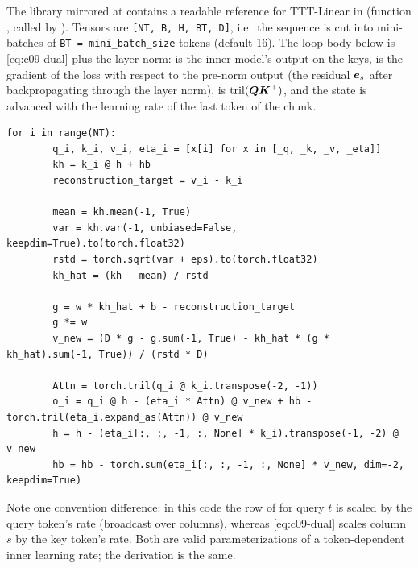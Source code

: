 \begin{implnote}[title={In the code: the dual form in \fla}]
The \fla{} library mirrored at  contains a readable
reference for TTT-Linear in  (function ,
called by ). Tensors are \texttt{[NT, B, H, BT, D]}, i.e.\ the
sequence is cut into  mini-batches of \texttt{BT = mini\_batch\_size} tokens (default
16). The loop body below is \eqref{eq:c09-dual} plus the layer norm:  is the inner
model's output on the keys,  is the gradient of the loss with respect to the
pre-norm output (the residual $\bm{e}_s$ after backpropagating through the layer norm),
 is $\operatorname{tril}(\bm{Q}\bm{K}^{\top})$, and the state  is advanced with the
learning rate of the last token of the chunk.
\end{implnote}

\begin{lstlisting}[caption={Excerpt from \texttt{repos/\allowbreak{}fla-org\_\_flash-linear-attention/\allowbreak{}fla/\allowbreak{}ops/\allowbreak{}ttt/\allowbreak{}naive.py}},label={lst:c09-fla-ttt}]
    for i in range(NT):
        q_i, k_i, v_i, eta_i = [x[i] for x in [_q, _k, _v, _eta]]
        kh = k_i @ h + hb
        reconstruction_target = v_i - k_i

        mean = kh.mean(-1, True)
        var = kh.var(-1, unbiased=False, keepdim=True).to(torch.float32)
        rstd = torch.sqrt(var + eps).to(torch.float32)
        kh_hat = (kh - mean) / rstd

        g = w * kh_hat + b - reconstruction_target
        g *= w
        v_new = (D * g - g.sum(-1, True) - kh_hat * (g * kh_hat).sum(-1, True)) / (rstd * D)

        Attn = torch.tril(q_i @ k_i.transpose(-2, -1))
        o_i = q_i @ h - (eta_i * Attn) @ v_new + hb - torch.tril(eta_i.expand_as(Attn)) @ v_new
        h = h - (eta_i[:, :, -1, :, None] * k_i).transpose(-1, -2) @ v_new
        hb = hb - torch.sum(eta_i[:, :, -1, :, None] * v_new, dim=-2, keepdim=True)
\end{lstlisting}

Note one convention difference: in this code the row of  for query $t$ is scaled
by the query token's rate  (broadcast over columns), whereas
\eqref{eq:c09-dual} scales column $s$ by the key token's rate. Both are valid
parameterizations of a token-dependent inner learning rate; the derivation is the same.

